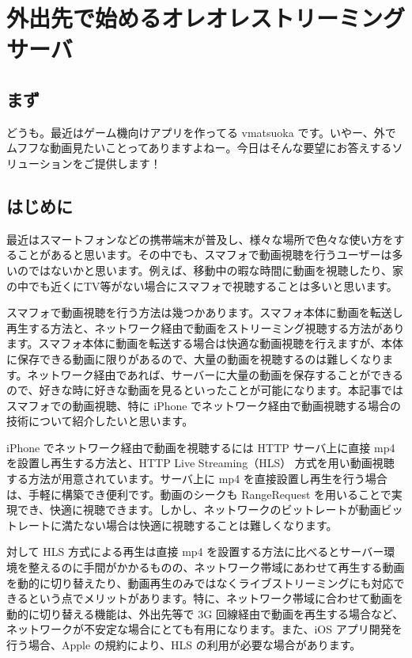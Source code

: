 \section{外出先で始めるオレオレストリーミングサーバ}

\subsection{まず}
 どうも。最近はゲーム機向けアプリを作ってる vmatsuoka です。いやー、外でムフフな動画見たいことってありますよねー。今日はそんな要望にお答えするソリューションをご提供します！

\subsection{はじめに}
 最近はスマートフォンなどの携帯端末が普及し、様々な場所で色々な使い方をすることがあると思います。その中でも、スマフォで動画視聴を行うユーザーは多いのではないかと思います。例えば、移動中の暇な時間に動画を視聴したり、家の中でも近くにTV等がない場合にスマフォで視聴することは多いと思います。

 スマフォで動画視聴を行う方法は幾つかあります。スマフォ本体に動画を転送し再生する方法と、ネットワーク経由で動画をストリーミング視聴する方法があります。スマフォ本体に動画を転送する場合は快適な動画視聴を行えますが、本体に保存できる動画に限りがあるので、大量の動画を視聴するのは難しくなります。ネットワーク経由であれば、サーバーに大量の動画を保存することができるので、好きな時に好きな動画を見るといったことが可能になります。本記事ではスマフォでの動画視聴、特に iPhone でネットワーク経由で動画視聴する場合の技術について紹介したいと思います。

 iPhone でネットワーク経由で動画を視聴するには HTTP サーバ上に直接 mp4 を設置し再生する方法と、HTTP Live Streaming（HLS） 方式を用い動画視聴する方法が用意されています。サーバ上に mp4 を直接設置し再生を行う場合は、手軽に構築でき便利です。動画のシークも RangeRequest を用いることで実現でき、快適に視聴できます。しかし、ネットワークのビットレートが動画ビットレートに満たない場合は快適に視聴することは難しくなります。

 対して HLS 方式による再生は直接 mp4 を設置する方法に比べるとサーバー環境を整えるのに手間がかかるものの、ネットワーク帯域にあわせて再生する動画を動的に切り替えたり、動画再生のみではなくライブストリーミングにも対応できるという点でメリットがあります。特に、ネットワーク帯域に合わせて動画を動的に切り替える機能は、外出先等で 3G 回線経由で動画を再生する場合など、ネットワークが不安定な場合にとても有用になります。また、iOS アプリ開発を行う場合、Apple の規約により、HLS の利用が必要な場合があります。


